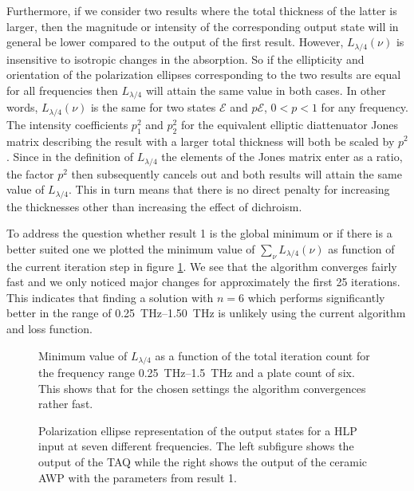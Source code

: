 Furthermore, if we consider two results where the total thickness of the latter is larger, then the magnitude or intensity of the corresponding output state will in general be lower compared to the output of the first result. However, $L_{\lambda/4}(\nu)$ is insensitive to isotropic changes in the absorption. So if the ellipticity and orientation of the polarization ellipses corresponding to the two results are equal for all frequencies then $L_{\lambda/4}$ will attain the same value in both cases. In other words, $L_{\lambda/4}(\nu)$ is the same for two states $\bm{\mathcal{E}}$ and $p\bm{\mathcal{E}}$, $0<p<1$ for any frequency. The intensity coefficients $p_1^2$ and $p_2^2$ for the equivalent elliptic diattenuator Jones matrix describing the result with a larger total thickness will both be scaled by $p^2$. Since in the definition of $L_{\lambda/4}$ the elements of the Jones matrix enter as a ratio, the factor $p^2$ then subsequently cancels out and both results will attain the same value of $L_{\lambda/4}$. This in turn means that there is no direct penalty for increasing the thicknesses other than increasing the effect of dichroism.

To address the question whether result 1 is the global minimum or if there is a better suited one we plotted the minimum value of $\sum_{\nu}L_{\lambda/4}(\nu)$ as function of the current iteration step in figure  \ref{fig:cl4_convergence}. We see that the algorithm converges fairly fast and we only noticed major changes for approximately the first 25 iterations. This indicates that finding a solution with $n=6$ which performs significantly better in the range of \SIrange{0.25}{1.50}{\tera \hertz} is unlikely using the current algorithm and loss function.

\begin{figure}[H]
    \centering
    
    \caption{Minimum value of $L_{\lambda/4}$ as a function of the total iteration count for the frequency range \SIrange{0.25}{1.5}{\tera \hertz} and a plate count of six. This shows that for the chosen settings the algorithm convergences rather fast.}
    \label{fig:cl4_convergence}
\end{figure}

\begin{figure}[H]
    \centering
    
    \caption{Polarization ellipse representation of the output states for a HLP input at seven different frequencies. The left subfigure shows the output of the TAQ while the right shows the output of the ceramic AWP with the parameters from result 1.}
    \label{fig:cl4_pe_lp}
\end{figure}

